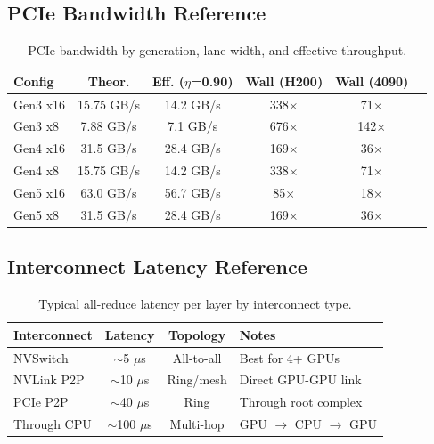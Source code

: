 \documentclass[11pt,a4paper]{article}
\theoremstyle{definition}
\begin{document}
\subsection{PCIe Bandwidth Reference}

\begin{table}[htbp]
\centering
\caption{PCIe bandwidth by generation, lane width, and effective throughput.}\label{tab:pcie_ref}
\begin{tabularx}{0.95\textwidth}{lccccX}
\toprule
\textbf{Config} & \textbf{Theor.} & \textbf{Eff. ($\eta$=0.90)} & \textbf{Wall (H200)} & \textbf{Wall (4090)} & \\
\midrule
Gen3 x16 & 15.75 GB/s & 14.2 GB/s & 338$\times$ & 71$\times$ & \\
Gen3 x8  & 7.88 GB/s  & 7.1 GB/s  & 676$\times$ & 142$\times$ & \\
Gen4 x16 & 31.5 GB/s  & 28.4 GB/s & 169$\times$ & 36$\times$ & \\
Gen4 x8  & 15.75 GB/s & 14.2 GB/s & 338$\times$ & 71$\times$ & \\
Gen5 x16 & 63.0 GB/s  & 56.7 GB/s & 85$\times$  & 18$\times$ & \\
Gen5 x8  & 31.5 GB/s  & 28.4 GB/s & 169$\times$ & 36$\times$ & \\
\bottomrule
\end{tabularx}
\end{table}

\subsection{Interconnect Latency Reference}

\begin{table}[htbp]
\centering
\caption{Typical all-reduce latency per layer by interconnect type.}\label{tab:latency}
\begin{tabular}{lccl}
\toprule
\textbf{Interconnect} & \textbf{Latency} & \textbf{Topology} & \textbf{Notes} \\
\midrule
NVSwitch       & $\sim$5 $\mu$s  & All-to-all  & Best for 4+ GPUs \\
NVLink P2P     & $\sim$10 $\mu$s & Ring/mesh   & Direct GPU-GPU link \\
PCIe P2P       & $\sim$40 $\mu$s & Ring        & Through root complex \\
Through CPU    & $\sim$100 $\mu$s & Multi-hop  & GPU $\to$ CPU $\to$ GPU \\
\bottomrule
\end{tabular}
\end{table}
\end{document}
